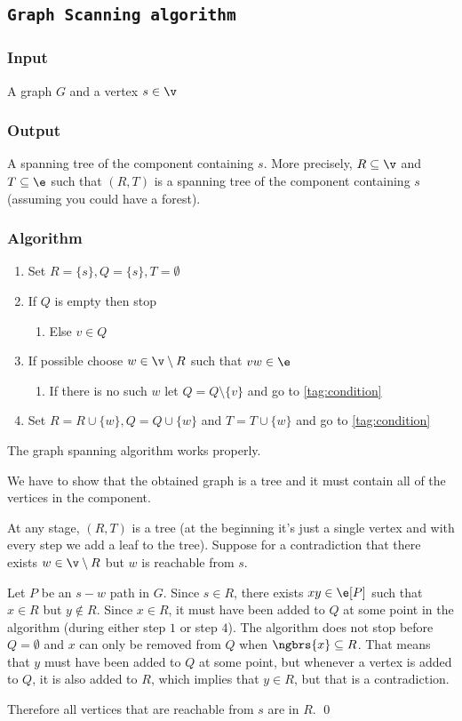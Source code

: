 \subsection{\texttt{Graph Scanning algorithm}}
\subsubsection{Input}
A graph $G$ and a vertex $s \in \v$
\subsubsection{Output}
A spanning tree of the component containing $s$. More precisely, $R \subseteq \v$ and $T \subseteq \e$ such that $(R, T)$ is a spanning tree of the component containing $s$ (assuming you could have a forest).
\subsubsection{Algorithm}
\begin{enumerate}
    \item Set $R = \{s\}, Q = \{s\}, T = \emptyset$
    \item \label{tag:condition} If $Q$ is empty then stop
    \begin{enumerate}
        \item Else $v \in Q$
    \end{enumerate}
    \item If possible choose $w \in \v \setminus R$ such that $vw \in \e$
    \begin{enumerate}
        \item If there is no such $w$ let $Q = Q \setminus \{v\}$ and go to \ref{tag:condition}
    \end{enumerate}
    \item Set $R = R \cup \{w\}, Q = Q \cup \{w\}$ and $T = T \cup \{w\}$ and go to \ref{tag:condition}
\end{enumerate}
\begin{lemma}
    The graph spanning algorithm works properly.
\end{lemma}
\begin{prf}
    We have to show that the obtained graph is a tree and it must contain all of the vertices in the component.

    At any stage, $(R, T)$ is a tree (at the beginning it's just a single vertex and with every step we add a leaf to the tree). Suppose for a contradiction that there exists $w \in \v \setminus R$ but $w$ is reachable from $s$.

    Let $P$ be an $s - w$ path in $G$. Since $s \in R$, there exists $xy \in \e[P]$ such that $x \in R$ but $y \notin R$. Since $x \in R$, it must have been added to $Q$ at some point in the algorithm (during either step $1$ or step $4$). The algorithm does not stop before $Q = \emptyset$ and $x$ can only be removed from $Q$ when $\ngbrs{x} \subseteq R$. That means that $y$ must have been added to $Q$ at some point, but whenever a vertex is added to $Q$, it is also added to $R$, which implies that $y \in R$, but that is a contradiction.

    Therefore all vertices that are reachable from $s$ are in $R$. \qed
\end{prf}
